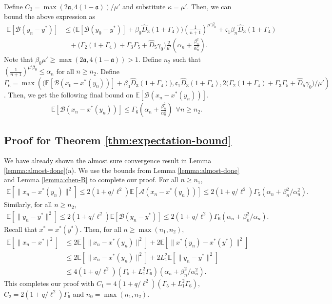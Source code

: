 \documentclass[letterpaper, 10 pt, conference]{ieeeconf}  %
\theoremstyle{definition}
\theoremstyle{plain}
\newcommand{\xstar}{x^*}
\newcommand{\ystar}{y^*}
\newcommand{\hD}{\hat{D}}
\newcommand{\EE}{\mathbb{E}}
\newcommand{\Acal}{\mathcal{A}}
\newcommand{\Bcal}{\mathcal{B}}
\newcommand{\cc}{\mathfrak{c}}
\newcommand{\afrak}{\mathfrak{a}}
\begin{document}
Define $C_3=\max(2\afrak, 4(1-\afrak))/\mu'$ and substitute $\kappa=\mu'$. Then, we can bound the above expression as
\begin{align*}
    \EE[\Bcal(y_n-\ystar)]&\leq\Big(\EE[\Bcal(y_0-\ystar)]+\beta_0\hD_3(1+\Gamma_4)\Big)\left(\frac{1}{n+1}\right)^{\mu'\beta_0}+\cc_1\beta_{n}\hD_3(1+\Gamma_4)\\
    &\;\;\;+\Big(\Gamma_2(1+\Gamma_4)+\Gamma_3\Gamma_5+\hD_5\gamma_0\Big)\frac{2}{\mu'}\left(\alpha_n+\frac{\beta_n^2}{\alpha_n^2}\right).
\end{align*}
Note that $\beta_0\mu'\geq \max(2\afrak, 4(1-\afrak))>1$. Define $n_2$ such that $\left(\frac{1}{n+1}\right)^{\mu'\beta_0}\leq \alpha_n$ for all $n\geq n_2$. Define $\Gamma_6=\max\left(\Big(\EE[\Bcal(x_0-\xstar(y_0))]+\beta_0\hD_3(1+\Gamma_4)\Big), \cc_1\hD_3(1+\Gamma_4), 2\Big(\Gamma_2(1+\Gamma_4)+\Gamma_3\Gamma_5+\hD_5\gamma_0\Big)/\mu'\right)$. Then, we get the following final bound on $\EE[\Bcal(x_n-\xstar(y_n))]$.
\begin{align*}
    \EE[\Bcal(x_n-\xstar(y_n))]\leq \Gamma_6\left(\alpha_n+\frac{\beta_n^2}{\alpha_n^2}\right) ~~\forall n\geq n_2.
\end{align*}

\subsection{\textbf{Proof for Theorem \ref{thm:expectation-bound}}}
We have already shown the almost sure convergence result in Lemma \ref{lemma:almost-done}(a). We use the bounds from Lemma \ref{lemma:almost-done} and Lemma \ref{lemma:chen-B} to complete our proof. For all $n\geq n_1$,
\begin{align*}
    \EE\left[\|x_n-\xstar(y_n)\|^2\right]\leq 2(1+q/\ell^2)\EE[\Acal(x_n-\xstar(y_n))]\leq 2(1+q/\ell^2)\Gamma_5(\alpha_n+\beta_n^2/\alpha_n^2).
\end{align*}
Similarly, for all $n\geq n_2$,
\begin{align*}
    \EE\left[\|y_n-\ystar\|^2\right]\leq 2(1+q/\ell^2)\EE[\Bcal(y_n-\ystar)]\leq 2(1+q/\ell^2)\Gamma_6(\alpha_n+\beta_n^2/\alpha_n).
\end{align*}
Recall that $\xstar=\xstar(\ystar)$. Then, for all $n\geq \max(n_1, n_2)$,
\begin{align*}
    \EE\left[\|x_n-\xstar\|^2\right]&\leq2\EE[\|x_n-\xstar(y_n)\|^2]+2\EE[\|\xstar(y_n)-\xstar(\ystar)\|^2]\\
    &\leq 2\EE[\|x_n-\xstar(y_n)\|^2]+2L_1^2\EE[\|y_n-\ystar\|^2]\\
    &\leq 4(1+q/\ell^2)(\Gamma_5+L_1^2\Gamma_6)(\alpha_n+\beta_n^2/\alpha_n^2).
\end{align*}
This completes our proof with $C_1=4(1+q/\ell^2)(\Gamma_5+L_1^2\Gamma_6)$, $C_2=2(1+q/\ell^2)\Gamma_6$ and $n_0=\max(n_1, n_2)$.
\end{document}
